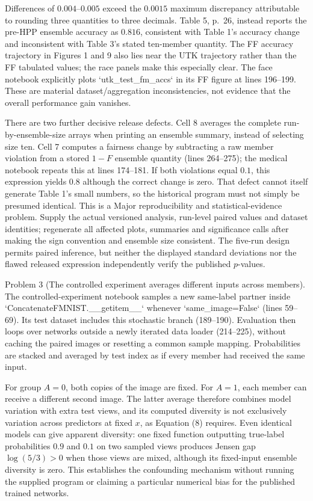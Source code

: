 \documentclass[10pt]{article}
\begin{document}
Differences of \(0.004\)–\(0.005\) exceed the \(0.0015\) maximum discrepancy attributable to rounding three quantities to three decimals. Table 5, p. 26, instead reports the pre-HPP ensemble accuracy as \(0.816\), consistent with Table 1’s accuracy change and inconsistent with Table 3’s stated ten-member quantity. The FF accuracy trajectory in Figures 1 and 9 also lies near the UTK trajectory rather than the FF tabulated values; the race panels make this especially clear. The face notebook explicitly plots `utk\_test\_fm\_accs` in its FF figure at lines 196–199. These are material dataset/aggregation inconsistencies, not evidence that the overall performance gain vanishes.\par
There are two further decisive release defects. Cell 8 averages the complete run-by-ensemble-size arrays when printing an ensemble summary, instead of selecting size ten. Cell 7 computes a fairness change by subtracting a raw member violation from a stored \(1-F\) ensemble quantity (lines 264–275); the medical notebook repeats this at lines 174–181. If both violations equal \(0.1\), this expression yields \(0.8\) although the correct change is zero. That defect cannot itself generate Table 1’s small numbers, so the historical program must not simply be presumed identical. This is a Major reproducibility and statistical-evidence problem. Supply the actual versioned analysis, run-level paired values and dataset identities; regenerate all affected plots, summaries and significance calls after making the sign convention and ensemble size consistent. The five-run design permits paired inference, but neither the displayed standard deviations nor the flawed released expression independently verify the published \(p\)-values.\par
Problem 3 (The controlled experiment averages different inputs across members).  The controlled-experiment notebook samples a new same-label partner inside `ConcatenateFMNIST.\_\_getitem\_\_` whenever `same\_image=False` (lines 59–69). Its test dataset includes this stochastic branch (189–190). Evaluation then loops over networks outside a newly iterated data loader (214–225), without caching the paired images or resetting a common sample mapping. Probabilities are stacked and averaged by test index as if every member had received the same input.\par
For group \(A=0\), both copies of the image are fixed. For \(A=1\), each member can receive a different second image. The latter average therefore combines model variation with extra test views, and its computed diversity is not exclusively variation across predictors at fixed \(x\), as Equation (8) requires. Even identical models can give apparent diversity: one fixed function outputting true-label probabilities \(0.9\) and \(0.1\) on two sampled views produces Jensen gap \(\log(5/3)>0\) when those views are mixed, although its fixed-input ensemble diversity is zero. This establishes the confounding mechanism without running the supplied program or claiming a particular numerical bias for the published trained networks.\par
\end{document}
